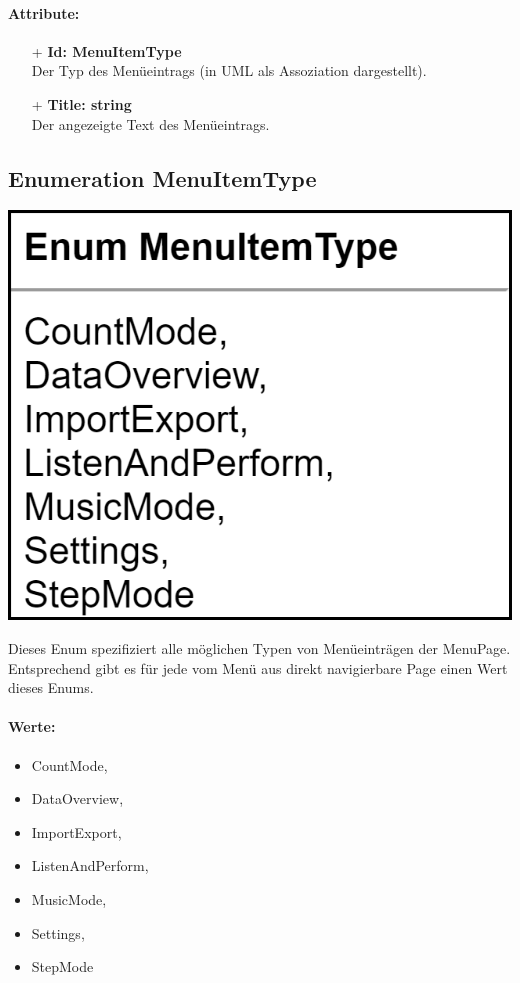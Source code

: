 \documentclass[a4paper,12pt]{article}
\begin{document}
	\paragraph{Attribute:}
	\begin{itemize}
		\item [+] \textbf{Id: MenuItemType}\\ Der Typ des Menüeintrags (in UML als Assoziation dargestellt).
		\item [+] \textbf{Title: string}\\ Der angezeigte Text des Menüeintrags.
	\end{itemize}
\begin{minipage}[b]{0.7\textwidth}

	\subsection{Enumeration MenuItemType}
\end{minipage}
\begin{minipage}[c]{0.3\textwidth}
	\includegraphics[width=\textwidth]{bilder/ViewModelKlassen/MenuItemType.png}
	\vspace{0.3cm}
\end{minipage}

	Dieses Enum spezifiziert alle möglichen Typen von Menüeinträgen der MenuPage. Entsprechend gibt es für jede vom Menü aus direkt navigierbare Page einen Wert dieses Enums.\\
	\paragraph{Werte:}
	\begin{itemize}
        \item CountMode,
        \item DataOverview,
        \item ImportExport,
        \item ListenAndPerform,
        \item MusicMode,
        \item Settings,
        \item StepMode
	\end{itemize}
\end{document}
